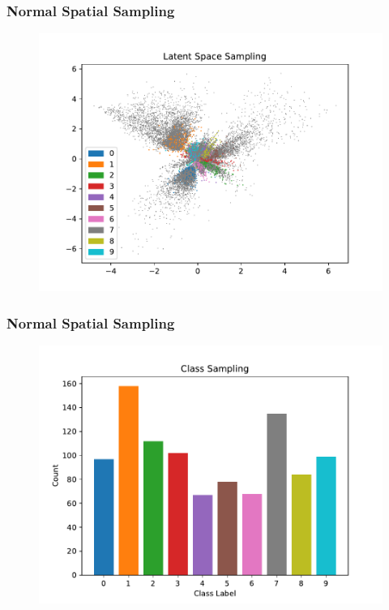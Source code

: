 \documentclass[10pt, usenames, dvipsnames, table]{beamer}
\begin{document}
\begin{frame}
  \frametitle{Normal Spatial Sampling}
  \begin{figure}
    \centering
    \includegraphics[width=\linewidth]
    {models/mnist_vae_e300_L2_b64/multi-normal_sampling_1000}
    \caption{}
    \label{}
  \end{figure}
\end{frame}

\begin{frame}
  \frametitle{Normal Spatial Sampling}
  \begin{figure}
    \centering
    \includegraphics[width=\linewidth]
    {models/mnist_vae_e300_L2_b64/multi-normal_sampling_distribution_1000}
    \caption{}
    \label{}
  \end{figure}
\end{frame}
\end{document}
